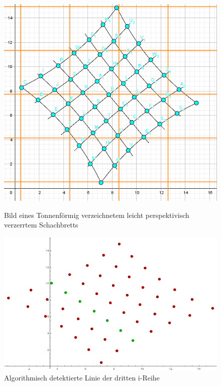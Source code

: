 %
%

\begin{figure}[!htb]
	\includegraphics[width=\linewidth]{images/extrBsp.png}
	\caption{Bild eines Tonnenförmig verzeichnetem leicht perspektivisch verzerrtem Schachbretts}
	\label{fig:awesome_image1}
	\endminipage\hfill
	\includegraphics[width=\linewidth]{images/AlgExtrBsp.png}
	\caption{Algorithmisch detektierte Linie der dritten i-Reihe}
	\label{fig:awesome_image2}
	\endminipage\hfill
\end{figure}

